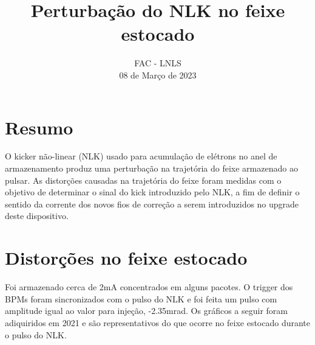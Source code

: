 \documentclass[a4paper,
               keeplastbox,   %
               ]{jacow}
\begin{document}
\title{Perturbação do NLK no feixe estocado}

\author{FAC - LNLS \\ 08 de Março de 2023}
\maketitle
%
\section{Resumo}
O kicker não-linear (NLK) usado para acumulação de elétrons no anel de armazenamento produz uma perturbação na trajetória do feixe armazenado ao pulsar. As distorções causadas na trajetória do feixe foram medidas com o objetivo de determinar o sinal do kick introduzido pelo NLK, a fim de definir o sentido da corrente dos novos fios de correção a serem introduzidos no upgrade deste dispositivo. 

\section{Distorções no feixe estocado}
Foi armazenado cerca de 2mA concentrados em alguns pacotes. O trigger dos BPMs foram sincronizados com o pulso do NLK e foi feita um pulso com amplitude igual ao valor para injeção, -2.35mrad. Os gráficos a seguir foram adiquiridos em 2021 e são representativos do que ocorre no feixe estocado durante o pulso do NLK.
\end{document}
